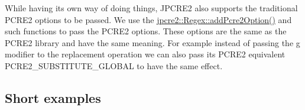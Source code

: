 While having its own way of doing things, J\+P\+C\+R\+E2 also supports the traditional P\+C\+R\+E2 options to be passed. We use the {\ttfamily \hyperlink{classjpcre2_1_1Regex_a2c7dcf12f26b2b046e147b013c8b5087}{jpcre2\+::\+Regex\+::add\+Pcre2\+Option()}} and such functions to pass the P\+C\+R\+E2 options. These options are the same as the P\+C\+R\+E2 library and have the same meaning. For example instead of passing the \textquotesingle{}g\textquotesingle{} modifier to the replacement operation we can also pass its P\+C\+R\+E2 equivalent {\ttfamily P\+C\+R\+E2\+\_\+\+S\+U\+B\+S\+T\+I\+T\+U\+T\+E\+\_\+\+G\+L\+O\+B\+AL} to have the same effect.\hypertarget{index_short-examples}{}\subsection{Short examples}\label{index_short-examples}

